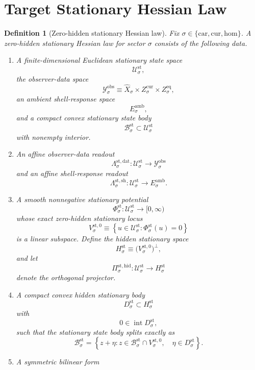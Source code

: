 \documentclass[11pt]{article}
\newcommand{\Car}{\mathrm{car}}
\newcommand{\Cur}{\mathrm{cur}}
\newcommand{\Hom}{\mathrm{hom}}
\newcommand{\VisibleAffine}[1]{\widehat X_{#1}}
\newcommand{\DataSpace}[1]{\mathcal Y_{#1}^{\mathrm{obs}}}
\newcommand{\AmbientTarget}[1]{E_{#1}^{\mathrm{amb}}}
\newcommand{\StatSpace}[1]{\mathcal U_{#1}^{\mathrm{st}}}
\newcommand{\StatBody}[1]{\mathcal B_{#1}^{\mathrm{st}}}
\newcommand{\StatData}[1]{\Lambda_{#1}^{\mathrm{st,dat}}}
\newcommand{\StatShell}[1]{\Lambda_{#1}^{\mathrm{st,sh}}}
\newcommand{\StatPotential}[1]{\Phi_{#1}^{\mathrm{st}}}
\newcommand{\StatZero}[1]{V_{#1}^{\mathrm{st},0}}
\newcommand{\StatHidden}[1]{H_{#1}^{\mathrm{st}}}
\newcommand{\StatHiddenBody}[1]{D_{#1}^{\mathrm{st}}}
\newcommand{\StatProj}[1]{\Pi_{#1}^{\mathrm{st,hid}}}
\newtheorem{definition}{Definition}
\begin{document}
\section{Target Stationary Hessian Law}

\begin{definition}[Zero-hidden stationary Hessian law]
\label{def:stationary}
Fix \(\sigma\in\{\Car,\Cur,\Hom\}\). A \emph{zero-hidden stationary Hessian law} for sector \(\sigma\) consists of the following data.
\begin{enumerate}
    \item A finite-dimensional Euclidean stationary state space
    \[
    \StatSpace{\sigma},
    \]
    the observer-data space
    \[
    \DataSpace{\sigma}
    \equiv
    \VisibleAffine{\sigma}\times Z_{\sigma}^{\mathrm{cur}}\times Z_{\sigma}^{\mathrm{eq}},
    \]
    an ambient shell-response space
    \[
    \AmbientTarget{\sigma},
    \]
    and a compact convex stationary state body
    \[
    \StatBody{\sigma}\subset\StatSpace{\sigma}
    \]
    with nonempty interior.
    \item An affine observer-data readout
    \[
    \StatData{\sigma}:\StatSpace{\sigma}\to\DataSpace{\sigma}
    \]
    and an affine shell-response readout
    \[
    \StatShell{\sigma}:\StatSpace{\sigma}\to\AmbientTarget{\sigma}.
    \]
    \item A smooth nonnegative stationary potential
    \[
    \StatPotential{\sigma}:\StatSpace{\sigma}\to[0,\infty)
    \]
    whose exact zero-hidden stationary locus
    \[
    \StatZero{\sigma}
    \equiv
    \left\{
    u\in\StatSpace{\sigma}:
    \StatPotential{\sigma}(u)=0
    \right\}
    \]
    is a linear subspace. Define the hidden stationary space
    \[
    \StatHidden{\sigma}
    \equiv
    \bigl(\StatZero{\sigma}\bigr)^{\perp},
    \]
    and let
    \[
    \StatProj{\sigma}:\StatSpace{\sigma}\to\StatHidden{\sigma}
    \]
    denote the orthogonal projector.
    \item A compact convex hidden stationary body
    \[
    \StatHiddenBody{\sigma}\subset\StatHidden{\sigma}
    \]
    with
    \[
    0\in\operatorname{int}\StatHiddenBody{\sigma},
    \]
    such that the stationary state body splits exactly as
    \begin{equation}
    \StatBody{\sigma}
    =
    \left\{
    z+\eta:
    z\in\StatBody{\sigma}\cap\StatZero{\sigma},
    \quad
    \eta\in\StatHiddenBody{\sigma}
    \right\}.
    \label{eq:statsplitting}
    \end{equation}
    \item A symmetric bilinear form

\end{enumerate}
\end{definition}
\end{document}
